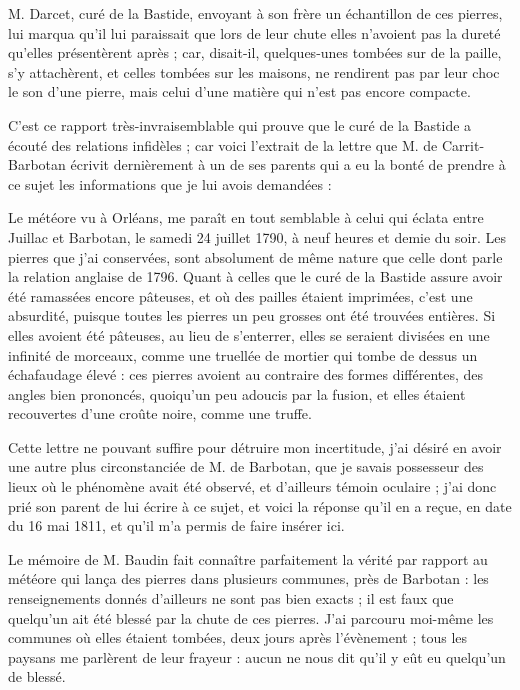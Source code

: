 \documentclass[a4paper, 12pt, oneside, french]{article}
\begin{document}
M. Darcet, curé de la Bastide, envoyant à son frère un échantillon de ces pierres, lui marqua qu'il lui paraissait que lors de leur chute elles n'avoient pas la dureté qu'elles présentèrent après ; car, disait-il, quelques-unes tombées sur de la paille, s'y attachèrent, et celles tombées sur les maisons, ne rendirent pas par leur choc le son d'une pierre, mais celui d'une matière qui n'est pas encore compacte.

C'est ce rapport très-invraisemblable qui prouve que le curé de la Bastide a écouté des relations infidèles ; car voici l'extrait de la lettre que M. de Carrit-Barbotan écrivit dernièrement à un de ses parents qui a eu la bonté de prendre à ce sujet les informations que je lui avois demandées :

\og Le météore vu à Orléans, me paraît en tout semblable à celui qui éclata entre Juillac et Barbotan, le samedi 24 juillet 1790, à neuf heures et demie du soir. Les pierres que j'ai conservées, sont absolument de même nature que celle dont parle la relation anglaise de 1796. Quant à celles que le curé de la Bastide assure avoir été ramassées encore pâteuses, et où des pailles étaient imprimées, c'est une absurdité, puisque toutes les pierres un peu grosses ont été trouvées entières. Si elles avoient été pâteuses, au lieu de s'enterrer, elles se seraient divisées en une infinité de morceaux, comme une truellée de mortier qui tombe de dessus un échafaudage élevé : ces pierres avoient au contraire des formes différentes, des angles bien prononcés, quoiqu’un peu adoucis par la fusion, et elles étaient recouvertes d'une croûte noire, comme une truffe. \fg

Cette lettre ne pouvant suffire pour détruire mon incertitude, j'ai désiré en avoir une autre plus circonstanciée de M. de Barbotan, que je savais possesseur des lieux où le phénomène avait été observé, et d'ailleurs témoin oculaire ; j'ai donc prié son parent de lui écrire à ce sujet, et voici la réponse qu'il en a reçue, en date du 16 mai 1811, et qu'il m'a permis de faire insérer ici.

\og Le mémoire de M. Baudin fait connaître parfaitement la vérité par rapport au météore qui lança des pierres dans plusieurs communes, près de Barbotan : les renseignements donnés d'ailleurs ne sont pas bien exacts ; il est faux que quelqu'un ait été blessé par la chute de ces pierres. J'ai parcouru moi-même les communes où elles étaient tombées, deux jours après l'évènement ; tous les paysans me parlèrent de leur frayeur : aucun ne nous dit qu'il y eût eu quelqu'un de blessé. \fg
\end{document}
